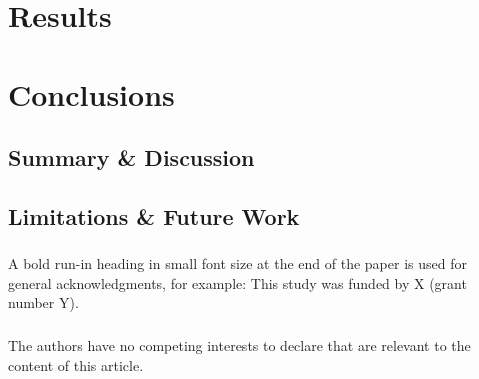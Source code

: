 \documentclass[runningheads]{llncs}
\begin{document}
\section{Results}\label{sec:results}

\section{Conclusions}\label{sec:conclusion}

\subsection{Summary \& Discussion}

\subsection{Limitations \& Future Work}

\begin{credits}
    \subsubsection{\ackname} A bold run-in heading in small font size at the end of the paper is used for
    general acknowledgments, for example: This study was funded by X (grant number
    Y).

    \subsubsection{\discintname}
    The authors have no competing interests to declare that are relevant to the
    content of this article.
\end{credits}

%



\newpage
\appendix
\end{document}

